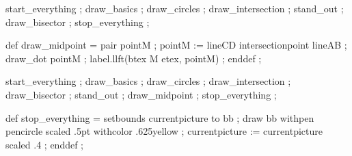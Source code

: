 \startbuffer[4]
start_everything ;
  draw_basics ; draw_circles ; draw_intersection ; stand_out ;
  draw_bisector ;
stop_everything ;
\stopbuffer

\startbuffer[g]
def draw_midpoint =
  pair pointM ;
  pointM := lineCD intersectionpoint lineAB ;
  draw_dot pointM ; label.llft(btex M etex, pointM) ;
enddef ;
\stopbuffer

\startbuffer[5]
start_everything ;
  draw_basics ; draw_circles ; draw_intersection ; draw_bisector ;
  stand_out ; draw_midpoint ;
stop_everything ;
\stopbuffer

\startbuffer[h]
def stop_everything =
  setbounds currentpicture to bb ;
  draw bb withpen pencircle scaled .5pt withcolor .625yellow ;
  currentpicture := currentpicture scaled .4 ;
enddef ;
\stopbuffer

  {
     {\processMPbuffer[a,b,c,d,e,f,g,2]}
     {\processMPbuffer[a,b,c,d,e,f,g,3]}
     {\processMPbuffer[a,b,c,d,e,f,g,4]}
     {\processMPbuffer[a,b,c,d,e,f,g,5]}
   \stopanimation}
